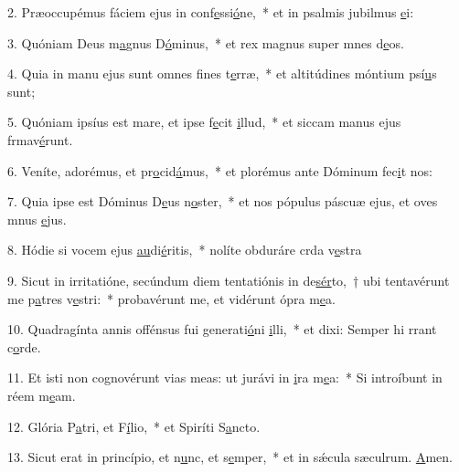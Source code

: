 2. Præoccupémus fáciem ejus in conf\uline{e}ssi\uline{ó}ne,~* et in psalmis jubilmus \uline{e}i:\par 
3. Quóniam Deus m\uline{a}gnus D\uline{ó}minus,~* et rex magnus super mnes d\uline{e}os.\par 
4. Quia in manu ejus sunt omnes f\uline{i}nes t\uline{e}rræ,~* et altitúdines móntium psí\uline{u}s sunt;\par 
5. Quóniam ipsíus est mare, et ipse f\uline{e}cit \uline{i}llud,~* et siccam manus ejus frmav\uline{é}runt.\par 
6. Veníte, adorémus, et pr\uline{o}cid\uline{á}mus,~* et plorémus ante Dóminum  fec\uline{i}t nos:\par 
7. Quia ipse est Dóminus D\uline{e}us n\uline{o}ster,~* et nos pópulus páscuæ ejus, et oves mnus \uline{e}jus.\par 
8. Hódie si vocem ejus \uline{au}di\uline{é}ritis,~* nolíte obduráre crda v\uline{e}stra\par 
9. Sicut in irritatióne, secúndum diem tentatiónis in de\uline{sér}to,~† ubi tentavérunt me p\uline{a}tres v\uline{e}stri:~* probavérunt me, et vidérunt ópra m\uline{e}a.\par 
10. Quadragínta annis offénsus fui generati\uline{ó}ni \uline{i}lli,~* et dixi: Semper hi rrant c\uline{o}rde.\par 
11. Et isti non cognovérunt vias meas: ut jurávi in \uline{i}ra m\uline{e}a:~* Si introíbunt in réem m\uline{e}am.\par 
12. Glória P\uline{a}tri, et F\uline{í}lio,~* et Spiríti S\uline{a}ncto.\par 
13. Sicut erat in princípio, et n\uline{u}nc, et s\uline{e}mper,~* et in sǽcula sæculrum. \uline{A}men.\par 
